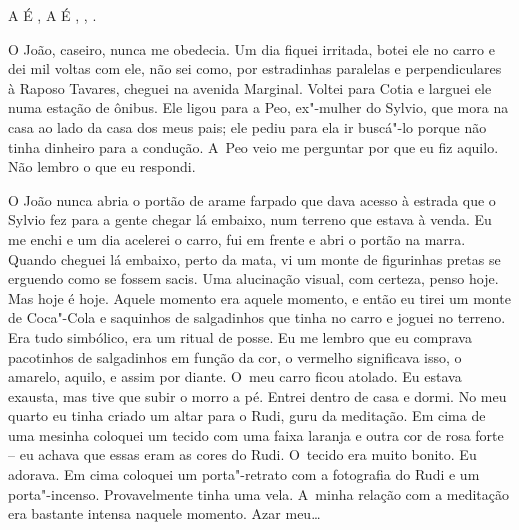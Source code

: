 A  É   ,   A  É    , 
,  .

O João, caseiro, nunca me obedecia. Um dia fiquei irritada, botei ele no
carro e dei mil voltas com ele, não sei como, por estradinhas paralelas
e perpendiculares à Raposo Tavares, cheguei na avenida Marginal. Voltei
para Cotia e larguei ele numa estação de ônibus. Ele ligou para a Peo,
ex"-mulher do Sylvio, que mora na casa ao lado da casa dos meus pais; ele
pediu para ela ir buscá"-lo porque não tinha dinheiro para a condução. A~Peo veio me perguntar por que eu fiz aquilo. Não lembro o que eu
respondi.

O João nunca abria o portão de arame farpado que dava acesso à estrada
que o Sylvio fez para a gente chegar lá embaixo, num terreno que estava
à venda. Eu me enchi e um dia acelerei o carro, fui em frente e abri o
portão na marra. Quando cheguei lá embaixo, perto da mata, vi um monte
de figurinhas pretas se erguendo como se fossem sacis. Uma alucinação
visual, com certeza, penso hoje. Mas hoje é hoje. Aquele momento era
aquele momento, e então eu tirei um monte de Coca"-Cola e saquinhos de
salgadinhos que tinha no carro e joguei no terreno. Era tudo simbólico,
era um ritual de posse. Eu me lembro que eu comprava pacotinhos de
salgadinhos em função da cor, o vermelho significava isso, o amarelo,
aquilo, e assim por diante. O~meu carro ficou atolado. Eu estava
exausta, mas tive que subir o morro a pé. Entrei dentro de casa e dormi.
No meu quarto eu tinha criado um altar para o Rudi, guru da meditação.
Em cima de uma mesinha coloquei um tecido com uma faixa laranja e outra
cor de rosa forte -- eu achava que essas eram as cores do Rudi. O~tecido
era muito bonito. Eu adorava. Em cima coloquei um porta"-retrato com a
fotografia do Rudi e um porta"-incenso. Provavelmente tinha uma vela. A~minha relação com a meditação era bastante intensa naquele momento. Azar
meu…


